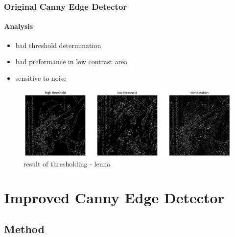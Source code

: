 \documentclass[
	11pt, %
	aspectratio=169, %
]{beamer}
\begin{document}
\begin{frame}
	\frametitle{Original Canny Edge Detector}
	\framesubtitle{Analysis}

	\begin{itemize}
		\item bad threshold determination
		\item bad preformance in low contrast area
		\item sensitive to noise
	\end{itemize}
	\begin{figure}
		\includegraphics[width=0.8\linewidth]{lenna_threshold_compare.png}
		\caption{result of thresholding - lenna}
	\end{figure}

\end{frame}

\section{Improved Canny Edge Detector}
\subsection{Method}
\end{document}
